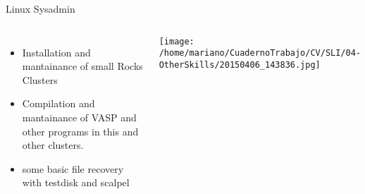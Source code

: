 \begin{frame}{Linux Sysadmin}

\begin{columns}

\begin{itemize}
\item Installation and mantainance of {\tiny small} Rocks Clusters
\item Compilation and mantainance of VASP and other 
programs in this and other clusters. 
\item some basic file recovery with testdisk and scalpel
\end{itemize}
\texttt{[image: /home/mariano/CuadernoTrabajo/CV/SLI/04-OtherSkills/20150406\_143836.jpg]}


\end{columns}

\end{frame}

